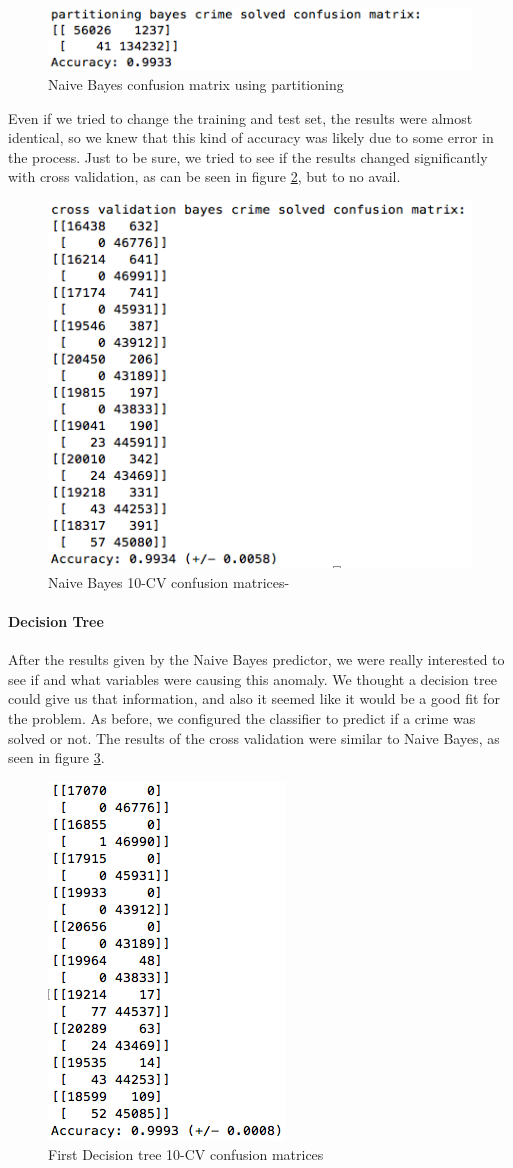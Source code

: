 \documentclass[12pt]{report}
\begin{document}
\begin{figure}[h]
  \centering
  \includegraphics[width=0.5\linewidth]{../Images/PartitioningNaiveBayesCM}
  \caption{Naive Bayes confusion matrix using partitioning}
  \label{fig:PNBCM}
\end{figure}

Even if we tried to change the training and test set, the results were almost identical, so we knew that this kind of accuracy was likely due to some error in the process. Just to be sure, we tried to see if the results changed significantly with cross validation, as can be seen in figure \ref{fig:CVNBCM}, but to no avail.

\begin{figure}[h]
  \centering
  \includegraphics[width=0.5\linewidth]{../Images/CVNaiveBayesCM}
  \caption{Naive Bayes 10-CV confusion matrices-}
  \label{fig:CVNBCM}
\end{figure}

\paragraph{Decision Tree}

After the results given by the Naive Bayes predictor, we were really interested to see if and what variables were causing this anomaly. We thought a decision tree could give us that information, and also it seemed like it would be a good fit for the problem. As before, we configured the classifier to predict if a crime was solved or not. The results of the cross validation were similar to Naive Bayes, as seen in figure \ref{fig:PDTCM}.

\begin{figure}[h]
  \centering
  \includegraphics[width=0.25\linewidth]{../Images/PerfectDecisionTreeCM}
  \caption{First Decision tree 10-CV confusion matrices}
  \label{fig:PDTCM}
\end{figure}
\end{document}
